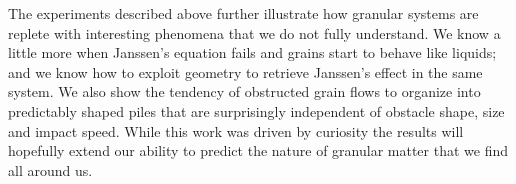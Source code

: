 
The experiments described above further illustrate how granular systems are replete with interesting phenomena that we do not fully understand. We know a little more when Janssen's equation fails and grains start to behave like liquids; and we know how to exploit geometry to retrieve Janssen's effect in the same system. We also show the tendency of obstructed grain flows to organize into predictably shaped piles that are surprisingly independent of obstacle shape, size and impact speed. While this work was driven by curiosity the results will hopefully extend our ability to predict the nature of granular matter that we find all around us. 